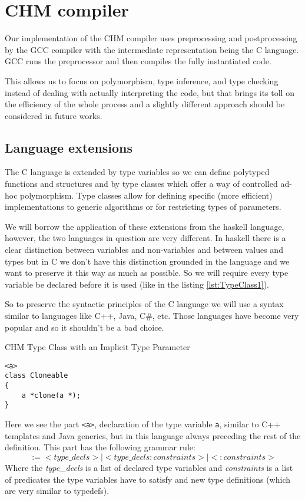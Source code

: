\chapter{CHM compiler}

Our implementation of the CHM compiler uses preprocessing and postprocessing by the GCC compiler with the intermediate representation being the C language. GCC runs the preprocessor and then compiles the fully instantiated code.

This allows us to focus on polymorphism, type inference, and type checking instead of dealing with actually interpreting the code, but that brings its toll on the efficiency of the whole process and a slightly different approach should be considered in future works.

\section{Language extensions}

The C language is extended by type variables so we can define polytyped functions and structures and by type classes which offer a way of controlled ad-hoc polymorphism. Type classes allow for defining specific (more efficient) implementations to generic algorithms or for restricting types of parameters.

We will borrow the application of these extensions from the haskell language, however, the two languages in question are very different. In haskell there is a clear distinction between variables and non-variables and between values and types but in C we don't have this distinction grounded in the language and we want to preserve it this way as much as possible. So we will require every type variable be declared before it is used (like in the listing \ref{lst:TypeClass1}).

So to preserve the syntactic principles of the C language we will use a syntax similar to languages like C++, Java, C\#, etc. Those languages have become very popular and so it shouldn't be a bad choice.

\begin{listing}
\caption{CHM Type Class with an Implicit Type Parameter}
\label{lst:TypeClass1}
\begin{lstlisting}
<a>
class Cloneable
{
    a *clone(a *);
}
\end{lstlisting}
Here we see the part \lstinline{<a>}, declaration of the type variable \lstinline{a}, similar to C++ templates and Java generics, but in this language always preceding the rest of the definition. This part has the following grammar rule: %
$$:= <type\_decls> | <type\_decls : constraints> | < : constraints >$$
Where the \emph{type\_decls} is a list of declared type variables and \emph{constraints} is a list of predicates the type variables have to satisfy and new type definitions (which are very similar to typedefs).
\end{listing}

